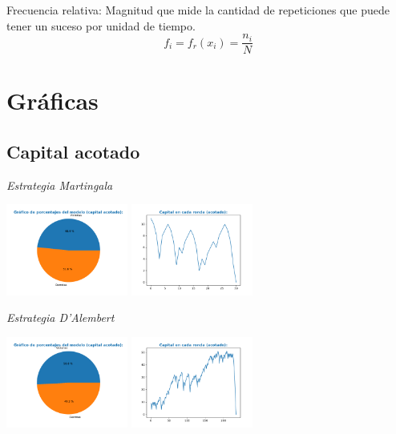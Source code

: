 \documentclass{article}
\begin{document}
    Frecuencia relativa: Magnitud que mide la cantidad de repeticiones que puede tener un suceso por unidad de tiempo.
    \begin{equation}
        f_{i} = f_{r}(x_{i}) = \frac {n_{i}}{N}
    \end{equation}

    \section{Gráficas}
    \subsection{Capital acotado}

    \vspace{1cm}

    {\itshape\Large Estrategia Martingala \par}

    \includegraphics[width=0.3\textwidth]{generated/porcentajes-martingala-acotado.pdf}
    \includegraphics[width=0.3\textwidth]{generated/capital-martingala-acotado.pdf}

    \vspace{1cm}

    {\itshape\Large Estrategia D’Alembert \par}

    \includegraphics[width=0.3\textwidth]{generated/porcentajes-d'alembert-acotado.pdf}
    \includegraphics[width=0.3\textwidth]{generated/capital-d'alembert-acotado.pdf}
\end{document}

